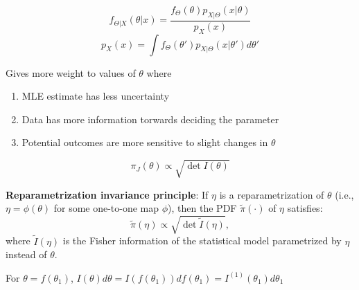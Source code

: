\documentclass[a4paper, 10pt,landscape]{article}
\begin{document}
\begin{multicols*}{4}
\begin{description}
\begin{enumerate}
					$$f_{\Theta|X}(\theta|x)=\frac{f_\Theta(\theta)p_{X|\Theta}(x|\theta)}{p_X(x)}$$
					$$p_X(x)=\int f_\Theta(\theta')p_{X|\Theta}(x|\theta')d\theta'$$
			\end{enumerate}
		\item[Jeffreys Prior] Gives more weight to values of $\theta$ where
			\begin{enumerate}
				\item MLE estimate has less uncertainty
				\item Data has more information torwards deciding the parameter
				\item Potential outcomes are more sensitive to slight changes in $\theta$
			\end{enumerate}
		$$\pi_J(\theta)\propto\sqrt{\det I(\theta)}$$
		\item{\bf Reparametrization invariance principle}: If $\eta$ is a reparametrization of $\theta$ (i.e., $\eta=\phi(\theta)$ for some one-to-one map $\phi$), then the PDF $\tilde{\pi}(\cdot)$ of $\eta$ satisfies:
	$$\tilde{\pi}(\eta)\propto\sqrt{\det\tilde{I}(\eta)},$$
	where $\tilde{I}(\eta)$ is the Fisher information of the statistical model parametrized by $\eta$ instead of $\theta$.
	
	For $\theta = f(\theta_1)$, $I(\theta)d\theta = I(f(\theta_1))df(\theta_1)=I^{(1)}(\theta_1)d\theta_1$
	\end{description}


\end{multicols*}
\end{document}
